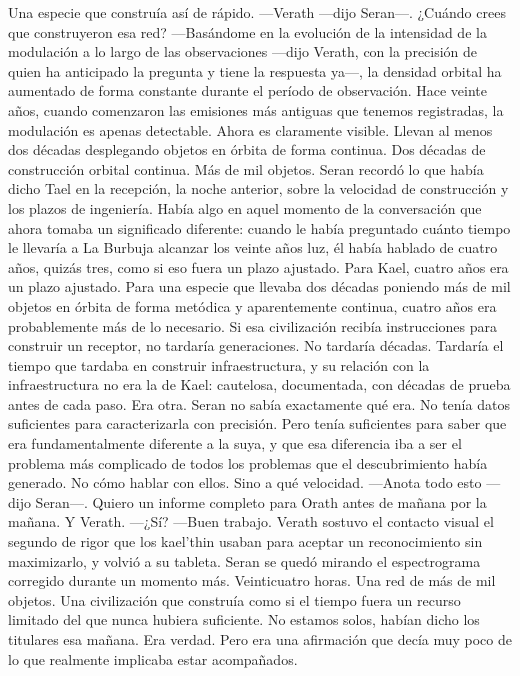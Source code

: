 \documentclass[11pt,a5paper,twoside]{book}
\begin{document}
Una especie que construía así de rápido.
—Verath —dijo Seran—. ¿Cuándo crees que construyeron esa red?
—Basándome en la evolución de la intensidad de la modulación a lo largo de las observaciones —dijo Verath, con la precisión de quien ha anticipado la pregunta y tiene la respuesta ya—, la densidad orbital ha aumentado de forma constante durante el período de observación. Hace veinte años, cuando comenzaron las emisiones más antiguas que tenemos registradas, la modulación es apenas detectable. Ahora es claramente visible. Llevan al menos dos décadas desplegando objetos en órbita de forma continua.
Dos décadas de construcción orbital continua. Más de mil objetos.
Seran recordó lo que había dicho Tael en la recepción, la noche anterior, sobre la velocidad de construcción y los plazos de ingeniería. Había algo en aquel momento de la conversación que ahora tomaba un significado diferente: cuando le había preguntado cuánto tiempo le llevaría a La Burbuja alcanzar los veinte años luz, él había hablado de cuatro años, quizás tres, como si eso fuera un plazo ajustado.
Para Kael, cuatro años era un plazo ajustado. Para una especie que llevaba dos décadas poniendo más de mil objetos en órbita de forma metódica y aparentemente continua, cuatro años era probablemente más de lo necesario.
Si esa civilización recibía instrucciones para construir un receptor, no tardaría generaciones. No tardaría décadas. Tardaría el tiempo que tardaba en construir infraestructura, y su relación con la infraestructura no era la de Kael: cautelosa, documentada, con décadas de prueba antes de cada paso.
Era otra.
Seran no sabía exactamente qué era. No tenía datos suficientes para caracterizarla con precisión. Pero tenía suficientes para saber que era fundamentalmente diferente a la suya, y que esa diferencia iba a ser el problema más complicado de todos los problemas que el descubrimiento había generado.
No cómo hablar con ellos. Sino a qué velocidad.
—Anota todo esto —dijo Seran—. Quiero un informe completo para Orath antes de mañana por la mañana. Y Verath.
—¿Sí?
—Buen trabajo.
Verath sostuvo el contacto visual el segundo de rigor que los kael'thin usaban para aceptar un reconocimiento sin maximizarlo, y volvió a su tableta.
Seran se quedó mirando el espectrograma corregido durante un momento más. Veinticuatro horas. Una red de más de mil objetos. Una civilización que construía como si el tiempo fuera un recurso limitado del que nunca hubiera suficiente.
No estamos solos, habían dicho los titulares esa mañana.
Era verdad. Pero era una afirmación que decía muy poco de lo que realmente implicaba estar acompañados.
\end{document}

